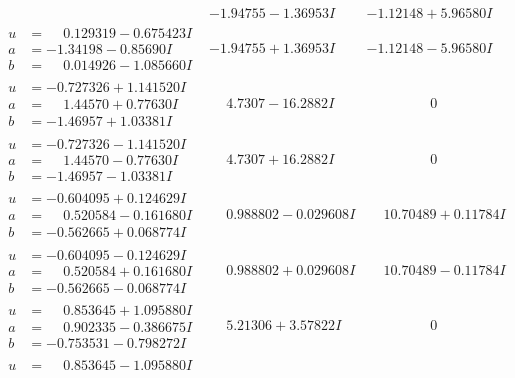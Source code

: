 \documentclass[1p]{elsarticle_modified}
\theoremstyle{definition}
\begin{document}
$$\begin{array}{c|c|c}
 & -1.94755 - 1.36953 I & -1.12148 + 5.96580 I \\ \hline\begin{aligned}
u &= \phantom{-}0.129319 - 0.675423 I \\
a &= -1.34198 - 0.85690 I \\
b &= \phantom{-}0.014926 - 1.085660 I\end{aligned}
 & -1.94755 + 1.36953 I & -1.12148 - 5.96580 I \\ \hline\begin{aligned}
u &= -0.727326 + 1.141520 I \\
a &= \phantom{-}1.44570 + 0.77630 I \\
b &= -1.46957 + 1.03381 I\end{aligned}
 & \phantom{-}4.7307 - 16.2882 I & \phantom{-0.000000 } 0 \\ \hline\begin{aligned}
u &= -0.727326 - 1.141520 I \\
a &= \phantom{-}1.44570 - 0.77630 I \\
b &= -1.46957 - 1.03381 I\end{aligned}
 & \phantom{-}4.7307 + 16.2882 I & \phantom{-0.000000 } 0 \\ \hline\begin{aligned}
u &= -0.604095 + 0.124629 I \\
a &= \phantom{-}0.520584 - 0.161680 I \\
b &= -0.562665 + 0.068774 I\end{aligned}
 & \phantom{-}0.988802 - 0.029608 I & \phantom{-}10.70489 + 0.11784 I \\ \hline\begin{aligned}
u &= -0.604095 - 0.124629 I \\
a &= \phantom{-}0.520584 + 0.161680 I \\
b &= -0.562665 - 0.068774 I\end{aligned}
 & \phantom{-}0.988802 + 0.029608 I & \phantom{-}10.70489 - 0.11784 I \\ \hline\begin{aligned}
u &= \phantom{-}0.853645 + 1.095880 I \\
a &= \phantom{-}0.902335 - 0.386675 I \\
b &= -0.753531 - 0.798272 I\end{aligned}
 & \phantom{-}5.21306 + 3.57822 I & \phantom{-0.000000 } 0 \\ \hline\begin{aligned}
u &= \phantom{-}0.853645 - 1.095880 I \\

\end{aligned}
\end{array}$$
\end{document}
